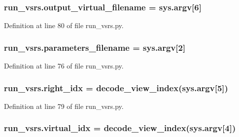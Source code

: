 \subsubsection[{\texorpdfstring{output\+\_\+virtual\+\_\+filename}{output_virtual_filename}}]{\setlength{\rightskip}{0pt plus 5cm}run\+\_\+vsrs.\+output\+\_\+virtual\+\_\+filename = sys.\+argv\mbox{[}6\mbox{]}}\hypertarget{namespacerun__vsrs_ab202a2d5cb4c68a83ecfc5781f284f16}{}\label{namespacerun__vsrs_ab202a2d5cb4c68a83ecfc5781f284f16}


Definition at line 80 of file run\+\_\+vsrs.\+py.

\subsubsection[{\texorpdfstring{parameters\+\_\+filename}{parameters_filename}}]{\setlength{\rightskip}{0pt plus 5cm}run\+\_\+vsrs.\+parameters\+\_\+filename = sys.\+argv\mbox{[}2\mbox{]}}\hypertarget{namespacerun__vsrs_a897778277f6ec39488136adbaae60614}{}\label{namespacerun__vsrs_a897778277f6ec39488136adbaae60614}


Definition at line 76 of file run\+\_\+vsrs.\+py.

\subsubsection[{\texorpdfstring{right\+\_\+idx}{right_idx}}]{\setlength{\rightskip}{0pt plus 5cm}run\+\_\+vsrs.\+right\+\_\+idx = decode\+\_\+view\+\_\+index(sys.\+argv\mbox{[}5\mbox{]})}\hypertarget{namespacerun__vsrs_aed17ae07d2eb1b1bb9be548e43d57cf0}{}\label{namespacerun__vsrs_aed17ae07d2eb1b1bb9be548e43d57cf0}


Definition at line 79 of file run\+\_\+vsrs.\+py.

\subsubsection[{\texorpdfstring{virtual\+\_\+idx}{virtual_idx}}]{\setlength{\rightskip}{0pt plus 5cm}run\+\_\+vsrs.\+virtual\+\_\+idx = decode\+\_\+view\+\_\+index(sys.\+argv\mbox{[}4\mbox{]})}\hypertarget{namespacerun__vsrs_a3980f369a001df8bf6754ee4db9cb31c}{}\label{namespacerun__vsrs_a3980f369a001df8bf6754ee4db9cb31c}


